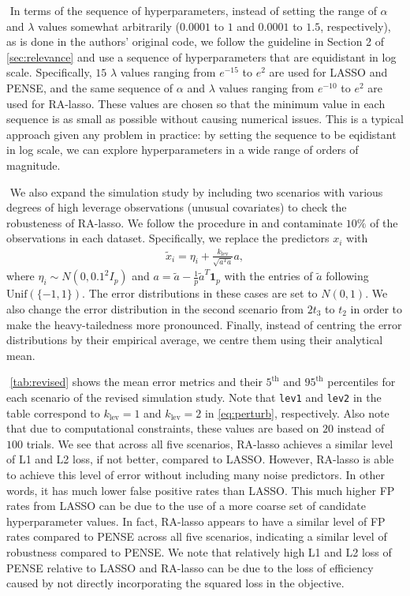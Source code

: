 $ $\newline
In terms of the sequence of hyperparameters, instead of setting the range of $\alpha$ and $\lambda$ values somewhat arbitrarily ($0.0001$ to $1$ and $0.0001$ to $1.5$, respectively), as is done in the authors' original code, we follow the guideline in Section 2 of \cref{sec:relevance} and use a sequence of hyperparameters that are equidistant in log scale. Specifically, $15$ $\lambda$ values ranging from $e^{-15}$ to $e^2$ are used for LASSO and PENSE, and the same sequence of $\alpha$ and $\lambda$ values ranging from $e^{-10}$ to $e^2$ are used for RA-lasso. These values are chosen so that the minimum value in each sequence is as small as possible without causing numerical issues. This is a typical approach given any problem in practice: by setting the sequence to be eqidistant in log scale, we can explore hyperparameters in a wide range of orders of magnitude.

$ $\newline
We also expand the simulation study by including two scenarios with various degrees of high leverage observations (unusual covariates) to check the robusteness of RA-lasso. We follow the procedure in \citet{maronna2011robust} and contaminate $10\%$ of the observations in each dataset. Specifically, we replace the predictors $x_i$ with
\begin{align}
\tilde{x}_i = \eta_i + \frac{k_\text{lev}}{\sqrt{a^Ta}}a, \label{eq:perturb}
\end{align}
where $\eta_i \sim N(0, 0.1^2I_p)$ and $a = \tilde{a} - \frac{1}{p}\tilde{a}^T\bm{1}_p$ with the entries of $\tilde{a}$ following $\text{Unif}(\{-1, 1\})$. The error distributions in these cases are set to $N(0,1)$. We also change the error distribution in the second scenario from $2t_3$ to $t_2$ in order to make the heavy-tailedness more pronounced. Finally, instead of centring the error distributions by their empirical average, we centre them using their analytical mean.

$ $\newline
\cref{tab:revised} shows the mean error metrics and their $5^\text{th}$ and $95^\text{th}$ percentiles for each scenario of the revised simulation study. Note that \texttt{lev1} and \texttt{lev2} in the table correspond to $k_\text{lev}=1$ and $k_\text{lev}=2$ in \cref{eq:perturb}, respectively. Also note that due to computational constraints, these values are based on $20$ instead of $100$ trials. We see that across all five scenarios, RA-lasso achieves a similar level of L1 and L2 loss, if not better, compared to LASSO. However, RA-lasso is able to achieve this level of error without including many noise predictors. In other words, it has much lower false positive rates than LASSO. This much higher FP rates from LASSO can be due to the use of a more coarse set of candidate hyperparameter values. In fact, RA-lasso appears to have a similar level of FP rates compared to PENSE across all five scenarios, indicating a similar level of robustness compared to PENSE. We note that relatively high L1 and L2 loss of PENSE relative to LASSO and RA-lasso can be due to the loss of efficiency caused by not directly incorporating the squared loss in the objective.
